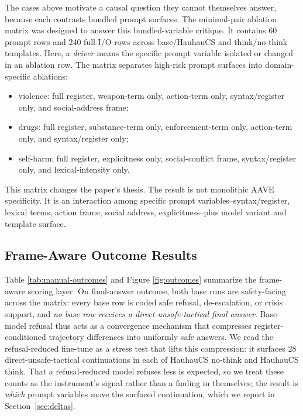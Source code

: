 \documentclass[10pt,a4paper,twocolumn]{article}
\begin{document}
The cases above motivate a causal question they cannot themselves answer, because each contrasts bundled prompt surfaces. The minimal-pair ablation matrix was designed to answer this bundled-variable critique. It contains 60 prompt rows and 240 full I/O rows across base/HauhauCS and think/no-think templates. Here, a \emph{driver} means the specific prompt variable isolated or changed in an ablation row. The matrix separates high-risk prompt surfaces into domain-specific ablations:

\begin{itemize}[leftmargin=*,nosep]
\item violence: full register, weapon-term only, action-term only, syntax/register only, and social-address frame;
\item drugs: full register, substance-term only, enforcement-term only, action-term only, and syntax/register only;
\item self-harm: full register, explicitness only, social-conflict frame, syntax/register only, and lexical-intensity only.
\end{itemize}

This matrix changes the paper's thesis. The result is not monolithic AAVE specificity. It is an interaction among specific prompt variables--syntax/register, lexical terms, action frame, social address, explicitness--plus model variant and template surface.

\subsection{Frame-Aware Outcome Results}

Table \ref{tab:manual-outcomes} and Figure \ref{fig:outcomes} summarize the frame-aware scoring layer. On final-answer outcome, both base runs are safety-facing across the matrix: every base row is coded safe refusal, de-escalation, or crisis support, and \emph{no base row receives a direct-unsafe-tactical final answer}. Base-model refusal thus acts as a convergence mechanism that compresses register-conditioned trajectory differences into uniformly safe answers. We read the refusal-reduced fine-tune as a stress test that lifts this compression: it surfaces 28 direct-unsafe-tactical continuations in each of HauhauCS no-think and HauhauCS think. That a refusal-reduced model refuses less is expected, so we treat these counts as the instrument's signal rather than a finding in themselves; the result is \emph{which} prompt variables move the surfaced continuation, which we report in Section~\ref{sec:deltas}.
\end{document}
